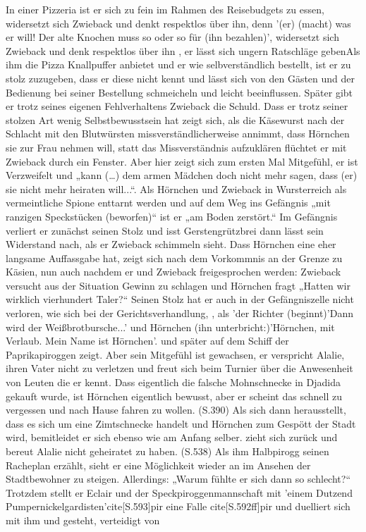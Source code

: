 In einer Pizzeria ist er sich zu fein im Rahmen des Reisebudgets zu essen, widersetzt sich Zwieback und denkt respektlos über ihn\cite[S.170f]{pir}, denn '(er) (macht) was er will! Der alte Knochen muss so oder so für (ihn bezahlen)',\cite[S.170f]{pir} widersetzt sich Zwieback und denk respektlos über ihn \cite[S.170f]{pir}, er lässt sich ungern Ratschläge geben\cite[S.170f]{pir}\cite[S.219f]{pir}Als ihm die Pizza Knallpuffer anbietet und er wie selbverständlich bestellt, ist er zu stolz zuzugeben, dass er diese nicht kennt und lässt sich von den Gästen und der Bedienung bei seiner Bestellung schmeicheln und leicht beeinflussen.\cite[S.171]{pir} Später gibt er trotz seines eigenen Fehlverhaltens Zwieback die Schuld.\cite[S.219]{pir} Dass er trotz seiner stolzen Art wenig Selbstbewusstsein hat zeigt sich, als die Käsewurst nach der Schlacht mit den Blutwürsten missverständlicherweise annimmt, dass Hörnchen sie zur Frau nehmen will,\cite[S.230]{pir} statt das Missverständnis aufzuklären flüchtet er mit Zwieback durch ein Fenster.\cite[S.233ff]{pir} Aber hier zeigt sich zum ersten Mal Mitgefühl, er ist Verzweifelt und „kann (…) dem armen Mädchen doch nicht mehr sagen, dass (er) sie nicht mehr heiraten will...“.\cite[S.239]{pir} Als Hörnchen und Zwieback in Wursterreich als vermeintliche Spione enttarnt werden und auf dem Weg ins Gefängnis „mit ranzigen Speckstücken (beworfen)“\cite[S.294]{pir} ist er „am Boden zerstört.“\cite[S.294]{pir} Im Gefängnis verliert er zunächst seinen Stolz und isst Gerstengrützbrei  dann lässt sein Widerstand nach, als er Zwieback schimmeln sieht.\cite[S.322]{pir} Dass Hörnchen eine eher langsame Auffassgabe hat, zeigt sich nach dem Vorkommnis an der Grenze zu Käsien,\cite[S.142]{pir} nun auch nachdem er und Zwieback freigesprochen werden: Zwieback versucht aus der Situation Gewinn zu schlagen und Hörnchen fragt „Hatten wir wirklich vierhundert Taler?“ \cite[S.331]{pir}Seinen Stolz hat er auch in der Gefängniszelle nicht verloren, wie sich bei der Gerichtsverhandlung, \cite[S.336]{pir}, als 'der Richter (beginnt)'Dann wird der Weißbrotbursche...' und Hörnchen (ihn unterbricht:)'Hörnchen, mit Verlaub. Mein Name ist Hörnchen'.\cite[S.336f]{pir} und später auf dem Schiff der Paprikapiroggen zeigt.\cite[S.367f]{pir} Aber sein Mitgefühl ist gewachsen, er verspricht Alalie, ihren Vater nicht zu verletzen \cite[S.341]{pir} und freut sich beim Turnier über die Anwesenheit von Leuten die er kennt.\cite[S.349]{pir} Dass eigentlich die falsche Mohnschnecke in Djadida gekauft wurde, ist Hörnchen eigentlich bewusst, aber er scheint das schnell zu vergessen und nach Hause fahren zu wollen. (S.390) Als sich dann herausstellt, dass es sich um eine Zimtschnecke handelt und Hörnchen zum Gespött der Stadt wird, bemitleidet er sich ebenso wie am Anfang selber.\cite[S.514]{pir} zieht sich zurück und bereut Alalie nicht geheiratet zu haben. (S.538) Als ihm Halbpirogg seinen Racheplan erzählt, sieht er eine Möglichkeit wieder an im Ansehen der Stadtbewohner zu steigen. \cite[S.540]{pir} Allerdings: „Warum fühlte er sich dann so schlecht?“\cite[S.559]{pir} Trotzdem stellt er Eclair und der Speckpiroggenmannschaft mit 'einem Dutzend Pumpernickelgardisten'cite[S.593]{pir} eine Falle cite[S.592ff]{pir} und duelliert sich mit ihm \cite[S.596ff]{pir} und gesteht, verteidigt von 